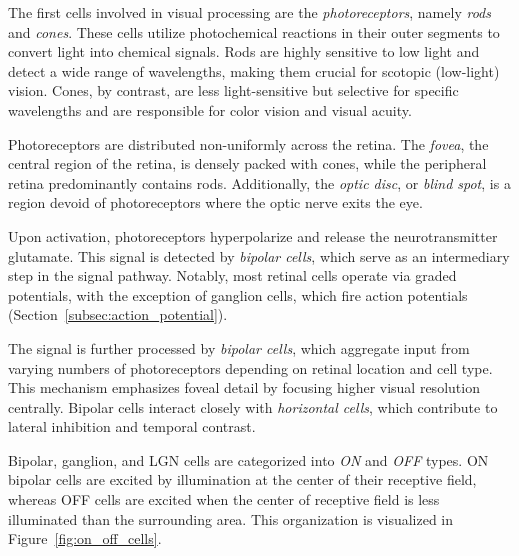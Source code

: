 The first cells involved in visual processing are the \emph{photoreceptors}, namely \emph{rods} and \emph{cones}. These cells utilize photochemical reactions in their outer segments to convert light into chemical signals. Rods are highly sensitive to low light and detect a wide range of wavelengths, making them crucial for scotopic (low-light) vision. Cones, by contrast, are less light-sensitive but selective for specific wavelengths and are responsible for color vision and visual acuity.

Photoreceptors are distributed non-uniformly across the retina. The \emph{fovea}, the central region of the retina, is densely packed with cones, while the peripheral retina predominantly contains rods. Additionally, the \emph{optic disc}, or \emph{blind spot}, is a region devoid of photoreceptors where the optic nerve exits the eye.

Upon activation, photoreceptors hyperpolarize and release the neurotransmitter glutamate. This signal is detected by \emph{bipolar cells}, which serve as an intermediary step in the signal pathway. Notably, most retinal cells operate via graded potentials, with the exception of ganglion cells, which fire action potentials (Section~\ref{subsec:action_potential}).

The signal is further processed by \emph{bipolar cells}, which aggregate input from varying numbers of photoreceptors depending on retinal location and cell type. This mechanism emphasizes foveal detail by focusing higher visual resolution centrally. Bipolar cells interact closely with \emph{horizontal cells}, which contribute to lateral inhibition and temporal contrast.

Bipolar, ganglion, and LGN cells are categorized into \emph{ON} and \emph{OFF} types. ON bipolar cells are excited by illumination at the center of their receptive field, whereas OFF cells are excited when the center of receptive field is less illuminated than the surrounding area. This organization is visualized in Figure~\ref{fig:on_off_cells}.

